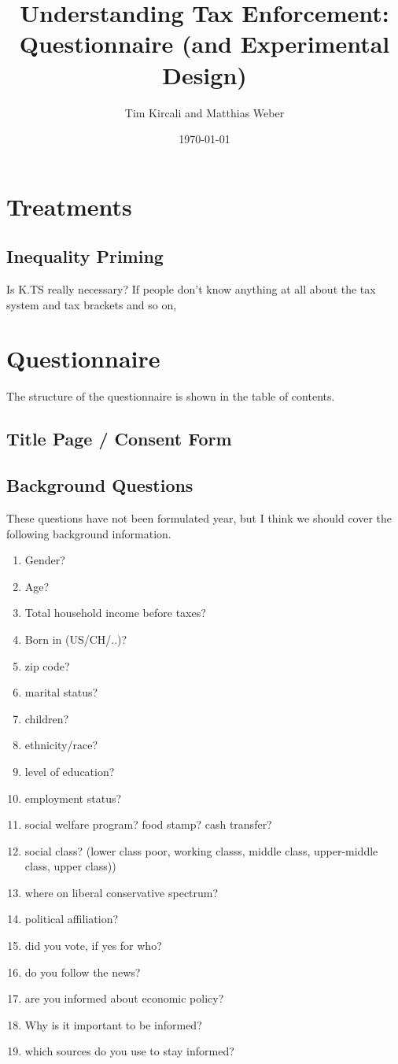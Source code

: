 \documentclass[12pt]{article}
\title{Understanding Tax Enforcement: Questionnaire (and Experimental Design)}
\author{Tim Kircali and Matthias Weber}
\date{\today} %
\begin{document}
\maketitle
\tableofcontents
\section{Treatments}
\subsection{Inequality Priming}
Is K.TS really necessary? If people don't know anything at all about the tax system and tax brackets and so on, 

\section{Questionnaire}
The structure of the questionnaire is shown in the table of contents.
\subsection{Title Page / Consent Form}
\subsection{Background Questions}
These questions have not been formulated year, but I think we should cover the following background information. 
\begin{enumerate}
    \item Gender?
    \item Age?
    \item Total household income before taxes?
    \item Born in (US/CH/..)?
    \item zip code?
    \item marital status?
    \item children?
    \item ethnicity/race?
    \item level of education?
    \item employment status?
    \item social welfare program? food stamp? cash transfer?
    \item social class? (lower class poor, working classs, middle class, upper-middle class, upper class))
    \item where on liberal conservative spectrum?
    \item political affiliation?
    \item did you vote, if yes for who?
    \item do you follow the news?
    \item are you informed about economic policy?
    \item Why is it important to be informed?
    \item which sources do you use to stay informed?
\end{enumerate}
\end{document}
